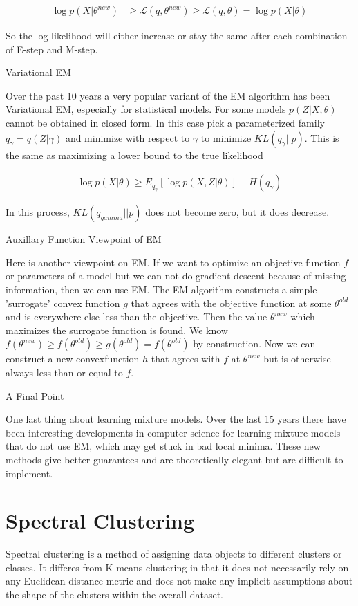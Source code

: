\documentclass[11pt]{article}
\begin{document}
\begin{align*}
\log p(X|\theta^{new}) &\geq \mathcal{L}(q,\theta^{new}) \geq \mathcal{L}(q,\theta) = \log p(X|\theta)
\end{align*}

So the log-likelihood will either increase or stay the same after each combination of E-step and M-step.

Variational EM

Over the past 10 years a very popular variant of the EM algorithm has been Variational EM, especially for statistical models.  For some models $p(Z|X,\theta)$ cannot be obtained in closed form.  In this case pick a parameterized family $q_{\gamma}=q(Z|\gamma)$ and minimize with respect to $\gamma$ to minimize $KL(q_{\gamma}||p)$.  This is the same as maximizing a lower bound to the true likelihood

\begin{align*}
\log p(X|\theta) \geq E_{q_{\gamma}}[\log p(X,Z|\theta)] + H(q_{\gamma})
\end{align*}

In this process, $KL(q_{gamma}||p)$ does not become zero, but it does decrease.

Auxillary Function Viewpoint of EM

Here is another viewpoint on EM.  If we want to optimize an objective function $f$ or parameters of a model but we can not do gradient descent because of missing information, then we can use EM.  The EM algorithm constructs a simple 'surrogate' convex function $g$ that agrees with the objective function at some $\theta^{old}$ and is everywhere else less than the objective.  Then the value $\theta^{new}$ which maximizes the surrogate function is found.  We know $f(\theta^{new}) \ge f(\theta^{old}) \ge g(\theta^{old}) = f(\theta^{old})$ by construction.  Now we can construct a new convexfunction $h$ that agrees with $f$ at $\theta^{new}$ but is otherwise always less than or equal to $f$.

A Final Point

One last thing about learning mixture models.  Over the last 15 years there have been interesting developments in computer science for learning mixture models that do not use EM, which may get stuck in bad local minima.  These new methods give better guarantees and are theoretically elegant but are difficult to implement.

\section{Spectral Clustering}
Spectral clustering is a method of assigning data objects to different clusters or classes.  It differes from K-means clustering in that it does not necessarily rely on any Euclidean distance metric and does not make any implicit assumptions about the shape of the clusters within the overall dataset.
\end{document}
